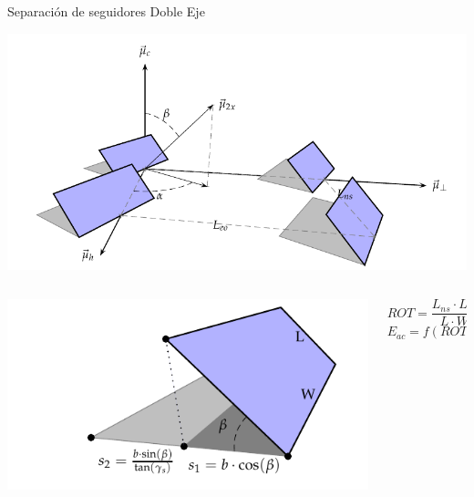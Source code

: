\documentclass[xcolor={usenames,svgnames,dvipsnames}]{beamer}
\begin{document}
\begin{frame}[label={sec:org3d10ae9}]{Separación de seguidores Doble Eje}
\begin{center}
\includegraphics[height=0.5\textheight]{../figs/Sombras2X.pdf}
\end{center}

\begin{columns}
\begin{column}{0.6\columnwidth}
\begin{center}
\includegraphics[width=.9\linewidth]{../figs/DimensionesSeguidorSombra.pdf}
\end{center}
\end{column}

\begin{column}{0.4\columnwidth}
$$ROT=\frac{L_{ns}\cdot L_{eo}}{L \cdot W}$$
$$E_{ac}=f(ROT)??$$
\end{column}
\end{columns}
\end{frame}
\end{document}
